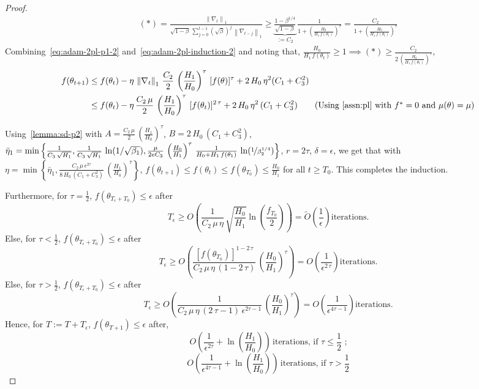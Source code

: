\documentclass{article}
\newcommand{\norm}[1]{\left\|#1 \right\|}
\newcommand{\tht}{\theta_t}
\newcommand{\thtt}{\theta_{t+1}}
\begin{document}
\begin{proof}
\begin{align}
(*) = \frac{\norm{\nabla_t}_1}{\sqrt{1 - \beta} \, \sum_{j = 0}^{t-1} (\sqrt{\beta})^{j} \, \norm{\nabla_{t-j}}_1} \geq \underbrace{\frac{1 - \beta^{1/4}}{\sqrt{1 - \beta}}}_{:= C_2} \, \frac{1}{1 + \left( \frac{H_0}{H_1 \, f(\tht)} \right)^{\tau} }  = \frac{C_2}{1 + \left( \frac{H_0}{H_1 \, f(\tht)} \right)^{\tau} }  \label{eq:adam-2pl-induction-2}
\end{align}
Combining~\cref{eq:adam-2pl-p1-2} and~\cref{eq:adam-2pl-induction-2} and noting that, $\frac{H_0}{H_1 \, f(\tht)} \geq 1 \implies (*) \geq \frac{C_2}{2 \, \left( \frac{H_0}{H_1 \, f(\tht)} \right)^{\tau}}$, 
\begin{align*}
f(\thtt) & \leq f(\tht) - \eta \, \norm{\nabla_t}_1 \, \frac{C_2}{2} \, \left(\frac{H_1}{H_0}\right)^\tau \, [f(\theta)]^\tau +  2 \, H_0  \, \eta^2(C_1+ C^2_3)  \\
& \leq f(\tht) - \eta \, \frac{C_2 \, \mu}{2} \, \left( \frac{H_1}{H_0} \right)^\tau \, [f(\tht)]^{2 \, \tau}+  2 \, H_0   \, \eta^2 \, (C_1+ C^2_3)\tag{Using~\cref{assn:pl} with $f^* = 0$ and $\mu(\theta) = \mu$}
\end{align*}

Using~\cref{lemma:sd-p2} with $A = \frac{C_2 \, \mu}{2} \, \left( \frac{H_1}{H_0} \right)^\tau$, $B = 2 \, H_0\, (C_1+ C^2_3) $, \\ $\bar{\eta}_1 = \min\left\{\frac{1}{C_3 \, \sqrt{H_1}}, \frac{1}{C_3 \, \sqrt{H_1}} \, \ln(1/\sqrt{\beta_1}), \frac{\mu  }{2 e C_3} \, \left(\frac{H_0}{H_1}\right)^\tau \, \frac{1}{H_0 + H_1 \, f(\theta_1)} \, \ln(\nicefrac{1}{\beta_2^{1/4}}) \right\}$, $r = 2\tau$,  $\delta = \epsilon$, we get that with \\ $\eta = \min\left\{\bar{\eta}_1, \frac{C_2 \, \mu \, \epsilon^{2\tau}}{8  \, H_0 \, (C_1+ C^2_3)} \, \left( \frac{H_1}{H_0} \right)^\tau \right\}$, $f(\thtt) \leq f(\tht) \leq f(\theta_{T_0}) \leq \frac{H_0}{H_1}$ for all $t \geq T_0$. This completes the induction.

Furthermore, for $\tau = \frac{1}{2}$, $f(\theta_{T_\epsilon + T_0}) \leq \epsilon$ after 
\[
T_\epsilon \geq O\left(\frac{1}{C_2 \, \mu \, \eta} \, \sqrt{\frac{H_0}{H_1} } \ln\left(\frac{f_{T_0}}{2}\right)\right) = \tilde O \left( \frac{1}{\epsilon} \right) \text{iterations}. 
\] 
Else, for $\tau < \frac{1}{2}$, $f(\theta_{T_\epsilon + T_0}) \leq \epsilon$ after 
\[
T_\epsilon \geq O \left( \frac{[f(\theta_{T_0})]^{1 - 2 \, \tau}}{C_2 \, \mu \, \eta \, (1 - 2 \, \tau)} \, \left( \frac{H_0}{H_1} \right)^\tau \right) = O \left( \frac{1}{\epsilon^{2 \, \tau}} \right) \text{iterations}. 
\]
Else, for $\tau > \frac{1}{2}$, $f(\theta_{T_\epsilon + T_0}) \leq \epsilon$ after 
\[
T_\epsilon \geq O \left(\frac{1}{C_2 \, \mu \, \eta \, (2 \, \tau - 1) \, \epsilon^{ 2 \tau - 1}} \, \left( \frac{H_0}{H_1} \right)^\tau \right) = O \left( \frac{1}{\epsilon^{4 \tau - 1}} \right) \text{iterations}. 
\]
Hence, for $T := T + T_\epsilon$, $f(\theta_{T+1}) \leq \epsilon$ after, 
\[
O \left( \frac{1}{\epsilon^{2 \tau}} + \ln \left( \frac{H_1}{H_0} \right) \right) \, \text{iterations, if $\tau \leq \frac{1}{2}$ ;}
\]
\[
O \left( \frac{1}{\epsilon^{4 \tau - 1}} + \ln \left( \frac{H_1}{H_0} \right) \right) \, \text{iterations, if $\tau > \frac{1}{2}$}
\]


\end{proof}
\end{document}
